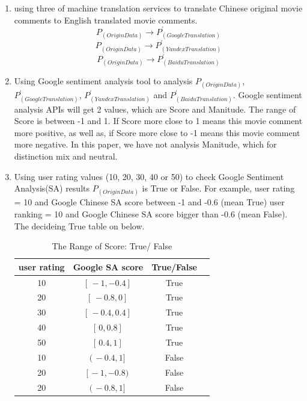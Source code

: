 \documentclass[conference]{IEEEtran}
\begin{document}
\begin{CJK*}{UTF8}{gbsn}
\begin{enumerate}
  \item using three of machine translation services to translate Chinese
    original movie comments to English translated movie comments.
    $$P_{(Origin Data)} \rightarrow P^{\prime}_{(Google Translation)}$$
    $$P_{(Origin Data)} \rightarrow P^{\prime}_{(Yandex Translation)}$$
    $$P_{(Origin Data)} \rightarrow P^{\prime}_{(Baidu Translation)}$$
  \item Using Google sentiment analysis tool to analysis $P_{(Origin Data)}$,
    $P^{\prime}_{(Google Translation)}$, $ P^{\prime}_{(Yandex Translation)}$ and $
    P^{\prime}_{(Baidu Translation)}$. Google sentiment analysis APIs will get 2
    values, which are Score and Manitude. The range of Score is between -1 and
    1. If Score more close to 1 means this movie comment more positive, as well
    as, if Score more close to -1 means this movie comment more negative. In
    this paper, we have not analysis Manitude, which for distinction mix and neutral.
  \item\label{itm:testingProcedure3} Using user rating values (10, 20, 30, 40 or 50) to check Google
    Sentiment Analysis(SA) results $P_{(Origin Data)} $ is True or False. For
    example, user rating = 10 and Google Chinese SA score between -1
    and -0.6 (mean True) user ranking = 10 and Google Chinese SA score bigger
    than -0.6 (mean False). The decideing True table on below.\\
     \begin{table}[h]
      \caption {The Range of Score: True/ False}
     \begin{center}
      \begin{tabular}{|c|c|c|c|}
        \hline
        user rating & Google SA score & True/False \\
        \hline\hline
        10 & $[ \, -1, -0.4 ] \,$ & True \\
        \hline
        20 & $[ \, -0.8, 0 ] \,$ & True \\
        \hline
        30 & $[ \, -0.4, 0.4 ] \,$ & True \\
        \hline
        40 & $[ \, 0, 0.8 ] \,$ & True \\
        \hline
        50 & $[ \, 0.4, 1 ] \,$ & True \\
        \hline \hline
        10 & $( \, -0.4, 1 ] \,$ & False \\
        \hline
        20 & $[ \, -1, -0.8) \,$ & False \\
        \hline
        20 & $( \, -0.8, 1] \,$ & False \\

\end{tabular}
\end{center}
\end{table}
\end{enumerate}
\end{CJK*}
\end{document}
